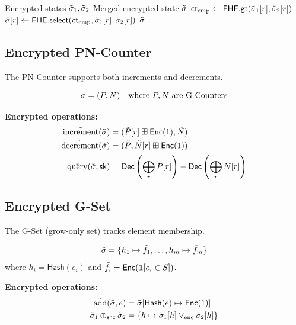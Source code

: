 \documentclass{../shared/luxfhe}
\begin{document}
\begin{algorithm}
\caption{Encrypted G-Counter Merge}
\begin{algorithmic}[1]
\Require Encrypted states $\tilde{\sigma}_1, \tilde{\sigma}_2$
\Ensure Merged encrypted state $\tilde{\sigma}$
    \State $\mathsf{ct}_{\text{cmp}} \gets \mathsf{FHE.gt}(\tilde{\sigma}_1[r], \tilde{\sigma}_2[r])$
    \State $\tilde{\sigma}[r] \gets \mathsf{FHE.select}(\mathsf{ct}_{\text{cmp}}, \tilde{\sigma}_1[r], \tilde{\sigma}_2[r])$
\EndFor
\State \Return $\tilde{\sigma}$
\end{algorithmic}
\end{algorithm}

\subsection{Encrypted PN-Counter}

The PN-Counter supports both increments and decrements.

\begin{definition}
\[
\sigma = (P, N) \quad \text{where } P, N \text{ are G-Counters}
\]
\end{definition}

\textbf{Encrypted operations:}
\begin{align}
\tilde{\text{increment}}(\tilde{\sigma}) &= (\tilde{P}[r] \boxplus \mathsf{Enc}(1), \tilde{N}) \\
\tilde{\text{decrement}}(\tilde{\sigma}) &= (\tilde{P}, \tilde{N}[r] \boxplus \mathsf{Enc}(1)) \\
\tilde{\text{query}}(\tilde{\sigma}, \mathsf{sk}) &= \mathsf{Dec}\left(\bigoplus_r \tilde{P}[r]\right) - \mathsf{Dec}\left(\bigoplus_r \tilde{N}[r]\right)
\end{align}

\subsection{Encrypted G-Set}

The G-Set (grow-only set) tracks element membership.

\begin{definition}
\[
\tilde{\sigma} = \{h_1 \mapsto \tilde{f}_1, \ldots, h_m \mapsto \tilde{f}_m\}
\]
where $h_i = \mathsf{Hash}(e_i)$ and $\tilde{f}_i = \mathsf{Enc}(\mathbf{1}[e_i \in S])$.
\end{definition}

\textbf{Encrypted operations:}
\begin{align}
\tilde{\text{add}}(\tilde{\sigma}, e) &= \tilde{\sigma}[\mathsf{Hash}(e) \mapsto \mathsf{Enc}(1)] \\
\tilde{\sigma}_1 \oplus_{\mathsf{enc}} \tilde{\sigma}_2 &= \{h \mapsto \tilde{\sigma}_1[h] \vee_{\text{enc}} \tilde{\sigma}_2[h]\}
\end{align}
\end{document}
